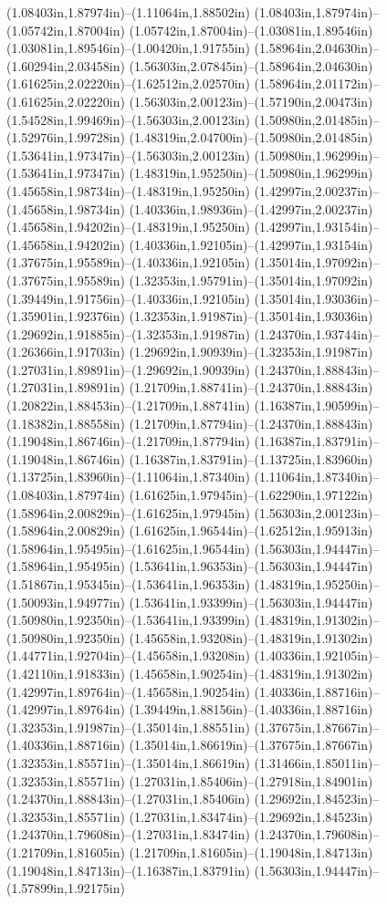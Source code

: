 (1.08403in,1.87974in)--(1.11064in,1.88502in) (1.08403in,1.87974in)--(1.05742in,1.87004in) (1.05742in,1.87004in)--(1.03081in,1.89546in) (1.03081in,1.89546in)--(1.00420in,1.91755in) (1.58964in,2.04630in)--(1.60294in,2.03458in) (1.56303in,2.07845in)--(1.58964in,2.04630in) (1.61625in,2.02220in)--(1.62512in,2.02570in) (1.58964in,2.01172in)--(1.61625in,2.02220in) (1.56303in,2.00123in)--(1.57190in,2.00473in) (1.54528in,1.99469in)--(1.56303in,2.00123in) (1.50980in,2.01485in)--(1.52976in,1.99728in) (1.48319in,2.04700in)--(1.50980in,2.01485in) (1.53641in,1.97347in)--(1.56303in,2.00123in) (1.50980in,1.96299in)--(1.53641in,1.97347in) (1.48319in,1.95250in)--(1.50980in,1.96299in) (1.45658in,1.98734in)--(1.48319in,1.95250in) (1.42997in,2.00237in)--(1.45658in,1.98734in) (1.40336in,1.98936in)--(1.42997in,2.00237in) (1.45658in,1.94202in)--(1.48319in,1.95250in) (1.42997in,1.93154in)--(1.45658in,1.94202in) (1.40336in,1.92105in)--(1.42997in,1.93154in) (1.37675in,1.95589in)--(1.40336in,1.92105in) (1.35014in,1.97092in)--(1.37675in,1.95589in) (1.32353in,1.95791in)--(1.35014in,1.97092in) (1.39449in,1.91756in)--(1.40336in,1.92105in) (1.35014in,1.93036in)--(1.35901in,1.92376in) (1.32353in,1.91987in)--(1.35014in,1.93036in) (1.29692in,1.91885in)--(1.32353in,1.91987in) (1.24370in,1.93744in)--(1.26366in,1.91703in) (1.29692in,1.90939in)--(1.32353in,1.91987in) (1.27031in,1.89891in)--(1.29692in,1.90939in) (1.24370in,1.88843in)--(1.27031in,1.89891in) (1.21709in,1.88741in)--(1.24370in,1.88843in) (1.20822in,1.88453in)--(1.21709in,1.88741in) (1.16387in,1.90599in)--(1.18382in,1.88558in) (1.21709in,1.87794in)--(1.24370in,1.88843in) (1.19048in,1.86746in)--(1.21709in,1.87794in) (1.16387in,1.83791in)--(1.19048in,1.86746in) (1.16387in,1.83791in)--(1.13725in,1.83960in) (1.13725in,1.83960in)--(1.11064in,1.87340in) (1.11064in,1.87340in)--(1.08403in,1.87974in) (1.61625in,1.97945in)--(1.62290in,1.97122in) (1.58964in,2.00829in)--(1.61625in,1.97945in) (1.56303in,2.00123in)--(1.58964in,2.00829in) (1.61625in,1.96544in)--(1.62512in,1.95913in) (1.58964in,1.95495in)--(1.61625in,1.96544in) (1.56303in,1.94447in)--(1.58964in,1.95495in) (1.53641in,1.96353in)--(1.56303in,1.94447in) (1.51867in,1.95345in)--(1.53641in,1.96353in) (1.48319in,1.95250in)--(1.50093in,1.94977in) (1.53641in,1.93399in)--(1.56303in,1.94447in) (1.50980in,1.92350in)--(1.53641in,1.93399in) (1.48319in,1.91302in)--(1.50980in,1.92350in) (1.45658in,1.93208in)--(1.48319in,1.91302in) (1.44771in,1.92704in)--(1.45658in,1.93208in) (1.40336in,1.92105in)--(1.42110in,1.91833in) (1.45658in,1.90254in)--(1.48319in,1.91302in) (1.42997in,1.89764in)--(1.45658in,1.90254in) (1.40336in,1.88716in)--(1.42997in,1.89764in) (1.39449in,1.88156in)--(1.40336in,1.88716in) (1.32353in,1.91987in)--(1.35014in,1.88551in) (1.37675in,1.87667in)--(1.40336in,1.88716in) (1.35014in,1.86619in)--(1.37675in,1.87667in) (1.32353in,1.85571in)--(1.35014in,1.86619in) (1.31466in,1.85011in)--(1.32353in,1.85571in) (1.27031in,1.85406in)--(1.27918in,1.84901in) (1.24370in,1.88843in)--(1.27031in,1.85406in) (1.29692in,1.84523in)--(1.32353in,1.85571in) (1.27031in,1.83474in)--(1.29692in,1.84523in) (1.24370in,1.79608in)--(1.27031in,1.83474in) (1.24370in,1.79608in)--(1.21709in,1.81605in) (1.21709in,1.81605in)--(1.19048in,1.84713in) (1.19048in,1.84713in)--(1.16387in,1.83791in) (1.56303in,1.94447in)--(1.57899in,1.92175in) 